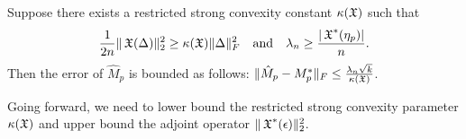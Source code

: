 


\begin{lemma}
Suppose there exists a restricted strong convexity constant $\kappa(\operatorname{\mathfrak{X}})$ such that
$$\frac{1}{2n} \| \operatorname{\mathfrak{X}}( \Delta )\|_2^2 \ge \kappa(\operatorname{\mathfrak{X}}) \|\Delta\|^2_F \quad \text{and} \quad
\lambda_n \ge \frac{|\operatorname{\mathfrak{X}}^*(\eta_p)|}{n}.$$
Then the error of $\hat M_p$ is bounded as follows:
$\| \hat M_p - M_p^* \|_F \le \frac{\lambda_n \sqrt{k}}{\kappa(\operatorname{\mathfrak{X}})}$.
\end{lemma}

Going forward, we need to lower bound the restricted strong convexity
parameter $\kappa(\operatorname{\mathfrak{X}})$ and upper bound the adjoint operator
$\|\operatorname{\mathfrak{X}}^*(\epsilon)\|_{2}^2$.

